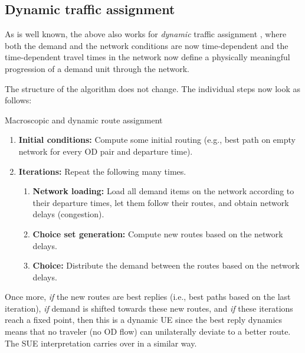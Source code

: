 \subsection{Dynamic traffic assignment}

As is well known, the above also works for \emph{dynamic} traffic
assignment \citep[DTA; see][]{peeta-2001}, where both the demand and the 
network conditions are now time-dependent and the time-dependent travel 
times in the network now define a physically meaningful progression of 
a demand unit through the network. 

The structure of the algorithm does not change. The individual steps now look as follows:
\begin{algorithm}[H]
\label{dynamic-macro-routes}

\caption{Macroscopic and dynamic route assignment}

\begin{enumerate}

\item \textbf{Initial conditions:} Compute some initial routing (e.g., best path on empty network
  for every OD pair and departure time).

\item \textbf{Iterations:} Repeat the following many times.

\begin{enumerate}

\item \textbf{Network loading:} Load all demand items on the network
  according to their departure times, let them follow their
  routes, and obtain network delays (congestion).

\item \textbf{Choice set generation:} Compute new routes based on the
  network delays.

\item \textbf{Choice:} Distribute the demand between the routes based
  on the network delays.

\end{enumerate} %

\end{enumerate}

\end{algorithm}

Once more, \emph{if} the new routes are best replies (i.e., best paths
based on the last iteration), \emph{if} demand is shifted towards
these new routes, and \emph{if} these iterations reach a fixed point,
then this is a dynamic UE since the best reply dynamics means that no
traveler (no OD flow) can unilaterally deviate to a better route.  The
SUE interpretation carries over in a similar way.

